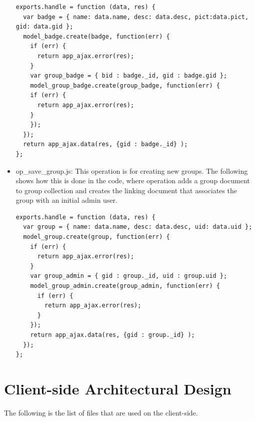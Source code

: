 \begin{itemize}
\begin{lstlisting}
exports.handle = function (data, res) {
  var badge = { name: data.name, desc: data.desc, pict:data.pict, gid: data.gid };
  model_badge.create(badge, function(err) {
    if (err) {
      return app_ajax.error(res);
    }
    var group_badge = { bid : badge._id, gid : badge.gid };
    model_group_badge.create(group_badge, function(err) {
    if (err) {
      return app_ajax.error(res);
    }
    });
  });
  return app_ajax.data(res, {gid : badge._id} );  
};
\end{lstlisting}

\item op{\_}save{\_}group.js: This operation is for creating new groups. The following shows how this is done in the code, where operation adds a group document to group collection and creates the linking document that associates the group with an initial admin user. 

\begin{lstlisting}
exports.handle = function (data, res) {
  var group = { name: data.name, desc: data.desc, uid: data.uid };
  model_group.create(group, function(err) {
    if (err) {
      return app_ajax.error(res);
    }
    var group_admin = { gid : group._id, uid : group.uid };
    model_group_admin.create(group_admin, function(err) {
      if (err) {
        return app_ajax.error(res);
      }      
    });
    return app_ajax.data(res, {gid : group._id} );
  });
};
\end{lstlisting}

\end{itemize}

\section{Client-side Architectural Design}
The following is the list of files that are used on the client-side.

